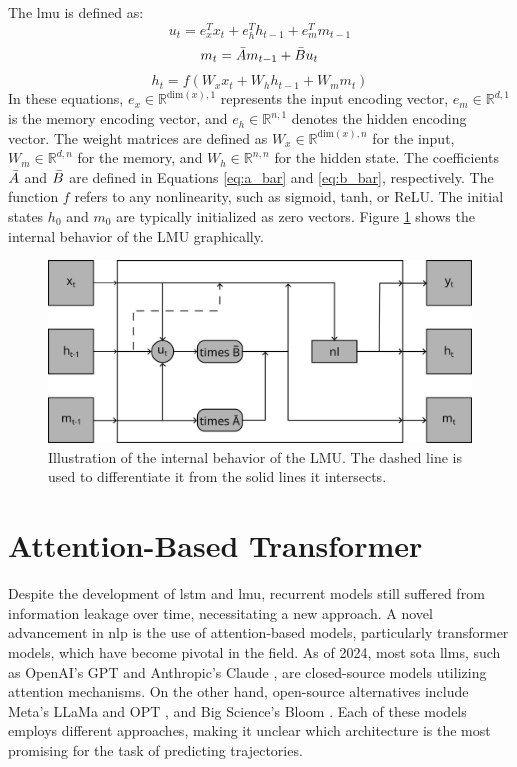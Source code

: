 The \gls{lmu} is defined as:
\begin{equation}
    u_t = e_x^T x_t + e_h^T h_{t-1} + e_m^T m_{t-1}
\end{equation}
\begin{equation}
    m_t = \Bar{A} m_{t-1} + \Bar{B} u_t
\end{equation}
\begin{equation}
    h_t = f(W_x x_t + W_h h_{t-1} + W_m m_t)
\end{equation}
In these equations, \(e_x \in \mathbb{R}^{\text{dim}(x),1}\) represents the input encoding vector, \(e_m \in \mathbb{R}^{d,1}\) is the memory encoding vector, and \(e_h \in \mathbb{R}^{n,1}\) denotes the hidden encoding vector. The weight matrices are defined as \(W_x \in \mathbb{R}^{\text{dim}(x),n}\) for the input, \(W_m \in \mathbb{R}^{d,n}\) for the memory, and \(W_h \in \mathbb{R}^{n,n}\) for the hidden state. The coefficients \(\Bar{A}\) and \(\Bar{B}\) are defined in Equations \eqref{eq:a_bar} and \eqref{eq:b_bar}, respectively. The function \(f\) refers to any nonlinearity, such as sigmoid, tanh, or ReLU. The initial states \(h_0\) and \(m_0\) are typically initialized as zero vectors. Figure \ref{fig:lmu} shows the internal behavior of the LMU graphically.


\begin{figure}[t]
    \centering
    \includegraphics[width=\textwidth]{contents/Basics/lmu.png}
    \caption{Illustration of the internal behavior of the LMU. The dashed line is used to differentiate it from the solid lines it intersects.}    
    \label{fig:lmu}
\end{figure}


\section{Attention-Based Transformer}
\label{sect:trafo}
Despite the development of \gls{lstm} and \gls{lmu}, recurrent models still suffered from information leakage over time, necessitating a new approach. A novel advancement in \gls{nlp} is the use of attention-based models, particularly transformer models, which have become pivotal in the field. As of 2024, most \gls{sota} \glspl{llm}, such as OpenAI's GPT \cite{gpt} and Anthropic's Claude \cite{claude}, are closed-source models utilizing attention mechanisms. On the other hand, open-source alternatives include Meta's LLaMa and OPT \cite{llama,opt}, and Big Science's Bloom \cite{bloom}. Each of these models employs different approaches, making it unclear which architecture is the most promising for the task of predicting trajectories.

